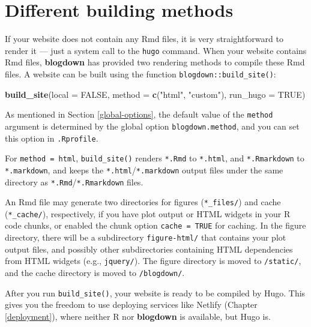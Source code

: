 \documentclass[12pt,]{krantz}
\makeatletter
\newenvironment{Shaded}{\begin{snugshade}}{\end{snugshade}}
\newcommand{\KeywordTok}[1]{\textcolor[rgb]{0.13,0.29,0.53}{\textbf{#1}}}
\newcommand{\DataTypeTok}[1]{\textcolor[rgb]{0.13,0.29,0.53}{#1}}
\newcommand{\StringTok}[1]{\textcolor[rgb]{0.31,0.60,0.02}{#1}}
\newcommand{\OtherTok}[1]{\textcolor[rgb]{0.56,0.35,0.01}{#1}}
\newcommand{\NormalTok}[1]{#1}
\newenvironment{kframe}{%
\medskip{}
\setlength{\fboxsep}{.8em}
 \def\at@end@of@kframe{}%
 \ifinner\ifhmode%
  \def\at@end@of@kframe{\end{minipage}}%
  \begin{minipage}{\columnwidth}%
 \fi\fi%
 \def\FrameCommand##1{\hskip\@totalleftmargin \hskip-\fboxsep
 \colorbox{shadecolor}{##1}\hskip-\fboxsep
     \hskip-\linewidth \hskip-\@totalleftmargin \hskip\columnwidth}%
 \MakeFramed {\advance\hsize-\width
   \@totalleftmargin\z@ \linewidth\hsize
   \@setminipage}}%
 {\par\unskip\endMakeFramed%
 \at@end@of@kframe}
\renewenvironment{Shaded}{\begin{kframe}}{\end{kframe}}
\theoremstyle{definition}
\theoremstyle{definition}
\theoremstyle{definition}
\theoremstyle{remark}
\makeatother
\begin{document}
\section{Different building methods}\label{methods}

If your website does not contain any Rmd files, it is very
straightforward to render it --- just a system call to the \texttt{hugo}
command. When your website contains Rmd files, \textbf{blogdown} has
provided two rendering methods to compile these Rmd files. A website can
be built using the function \texttt{blogdown::build\_site()}:

\begin{Shaded}
\begin{Highlighting}[]
\KeywordTok{build_site}\NormalTok{(}\DataTypeTok{local =} \OtherTok{FALSE}\NormalTok{, }\DataTypeTok{method =} \KeywordTok{c}\NormalTok{(}\StringTok{"html"}\NormalTok{, }\StringTok{"custom"}\NormalTok{),}
  \DataTypeTok{run_hugo =} \OtherTok{TRUE}\NormalTok{)}
\end{Highlighting}
\end{Shaded}

As mentioned in Section \ref{global-options}, the default value of the
\texttt{method} argument is determined by the global option
\texttt{blogdown.method}, and you can set this option in
\texttt{.Rprofile}.

For \texttt{method\ =\ \textquotesingle{}html\textquotesingle{}},
\texttt{build\_site()} renders \texttt{*.Rmd} to \texttt{*.html}, and
\texttt{*.Rmarkdown} to \texttt{*.markdown}, and keeps the
\texttt{*.html}/\texttt{*.markdown} output files under the same
directory as \texttt{*.Rmd}/\texttt{*.Rmarkdown} files.

An Rmd file may generate two directories for figures
(\texttt{*\_files/}) and cache (\texttt{*\_cache/}), respectively, if
you have plot output or HTML widgets \citep{R-htmlwidgets} in your R
code chunks, or enabled the chunk option \texttt{cache\ =\ TRUE} for
caching. In the figure directory, there will be a subdirectory
\texttt{figure-html/} that contains your plot output files, and possibly
other subdirectories containing HTML dependencies from HTML widgets
(e.g., \texttt{jquery/}). The figure directory is moved to
\texttt{/static/}, and the cache directory is moved to
\texttt{/blogdown/}.

After you run \texttt{build\_site()}, your website is ready to be
compiled by Hugo. This gives you the freedom to use deploying services
like Netlify (Chapter \ref{deployment}), where neither R nor
\textbf{blogdown} is available, but Hugo is.
\end{document}
